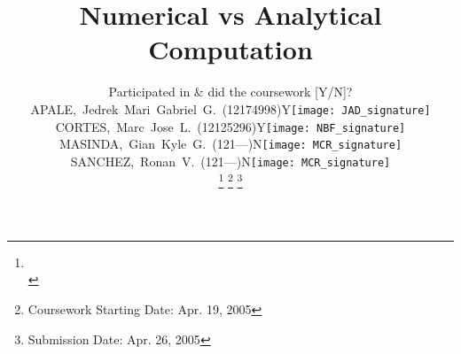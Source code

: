 




\title{Numerical vs Analytical Computation} %

\author{
	{\small
	\begin{tabular}{l l l}
    & \multicolumn{2}{c}{\tiny \textcolor[rgb]{0.9,0.9,0.9}{Participated in \& did the coursework [Y/N]?}} 
    \\ 
		APALE,~Jedrek~Mari~Gabriel~G.~(12174998) & Y & \texttt{[image: JAD\_signature]}
		\\ 
		CORTES,~Marc~Jose~L.~(12125296)     & Y & \texttt{[image: NBF\_signature]}
		\\ 
		MASINDA,~Gian~Kyle~G.~(121---)  & N & \texttt{[image: MCR\_signature]}
		\\ 
        SANCHEZ,~Ronan~V.~(121---)  & N & \texttt{[image: MCR\_signature]}
		\\ 
	\end{tabular}
	}
\thanks{\CrmD\protect\\} %
 \thanks{Coursework Starting Date: \hspace{1ex} Apr. 19, 2005}
\thanks{Submission Date: \hspace{1ex} Apr. 26, 2005}} 

%
{} %


